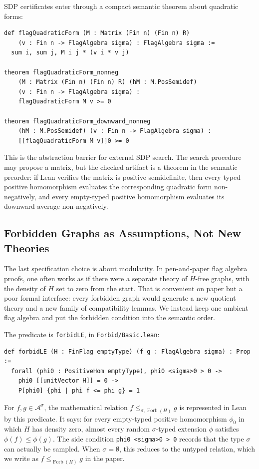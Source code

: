 \documentclass{article}
\newcommand{\forbLE}[1]{\leq_{\operatorname{Forb}(#1)}}
\newcommand{\forbLES}[2]{\leq_{#1,\operatorname{Forb}(#2)}}
\newcommand{\lean}[1]{\texttt{#1}}
\begin{document}
SDP certificates enter through a compact semantic theorem about quadratic
forms:
\begin{lstlisting}
def flagQuadraticForm (M : Matrix (Fin n) (Fin n) R)
    (v : Fin n -> FlagAlgebra sigma) : FlagAlgebra sigma :=
  sum i, sum j, M i j * (v i * v j)

theorem flagQuadraticForm_nonneg
    (M : Matrix (Fin n) (Fin n) R) (hM : M.PosSemidef)
    (v : Fin n -> FlagAlgebra sigma) :
    flagQuadraticForm M v >= 0

theorem flagQuadraticForm_downward_nonneg
    (hM : M.PosSemidef) (v : Fin n -> FlagAlgebra sigma) :
    [[flagQuadraticForm M v]]0 >= 0
\end{lstlisting}
This is the abstraction barrier for external SDP search.  The search procedure
may propose a matrix, but the checked artifact is a theorem in the semantic
preorder: if Lean verifies the matrix is positive semidefinite, then every
typed positive homomorphism evaluates the corresponding quadratic form
non-negatively, and every empty-typed positive homomorphism evaluates its
downward average non-negatively.

\subsection{Forbidden Graphs as Assumptions, Not New Theories}
\label{sec:forbidden}

The last specification choice is about modularity.  In pen-and-paper flag
algebra proofs, one often works as if there were a separate theory of
$H$-free graphs, with the density of $H$ set to zero from the start.  That is
convenient on paper but a poor formal interface: every forbidden graph would
generate a new quotient theory and a new family of compatibility lemmas.  We
instead keep one ambient flag algebra and put the forbidden condition into
the semantic order.

The predicate is \lean{forbidLE}, in \lean{Forbid/Basic.lean}:
\begin{lstlisting}
def forbidLE (H : FinFlag emptyType) (f g : FlagAlgebra sigma) : Prop :=
  forall (phi0 : PositiveHom emptyType), phi0 <sigma>0 > 0 ->
    phi0 [[unitVector H]] = 0 ->
    P[phi0] {phi | phi f <= phi g} = 1
\end{lstlisting}
For $f,g\in\mathcal{A}^\sigma$, the mathematical relation
$f \forbLES{\sigma}{H} g$ is represented in Lean by this predicate.  It says:
for every empty-typed positive homomorphism $\phi_0$ in which $H$ has density
zero, almost every random $\sigma$-typed extension $\phi$ satisfies
$\phi(f)\leq\phi(g)$.  The side condition \lean{phi0 <sigma>0 > 0} records
that the type $\sigma$ can actually be sampled.  When $\sigma=\emptyset$, this
reduces to the untyped relation, which we write as $f \forbLE{H} g$ in the
paper.
\end{document}

